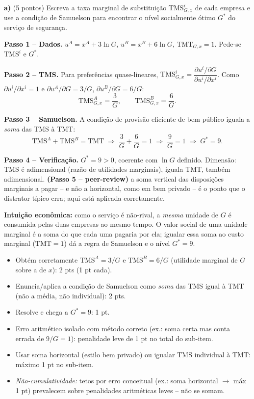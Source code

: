 \textbf{a)} (5 pontos) Escreva a taxa marginal de substitui\c{c}\~ao $\text{TMS}^i_{G,x}$ de cada empresa e use a condi\c{c}\~ao de Samuelson para encontrar o n\'ivel socialmente \'otimo $G^*$ do servi\c{c}o de seguran\c{c}a.
\resolucaobox{7.6cm}
\begin{solucao}
\textbf{Passo 1 -- Dados.} $u^A = x^A + 3\ln G$, $u^B = x^B + 6\ln G$, $\text{TMT}_{G,x}=1$. Pede-se $\text{TMS}^i$ e $G^*$.

\textbf{Passo 2 -- TMS.} Para prefer\^encias quase-lineares, $\text{TMS}^i_{G,x} = \dfrac{\partial u^i/\partial G}{\partial u^i/\partial x^i}$. Como $\partial u^i/\partial x^i = 1$ e $\partial u^A/\partial G = 3/G$, $\partial u^B/\partial G = 6/G$:
\[ \text{TMS}^A_{G,x} = \frac{3}{G}, \qquad \text{TMS}^B_{G,x} = \frac{6}{G}. \]

\textbf{Passo 3 -- Samuelson.} A condi\c{c}\~ao de provis\~ao eficiente de bem p\'ublico iguala a \emph{soma} das TMS \`a TMT:
\[ \text{TMS}^A + \text{TMS}^B = \text{TMT} \;\Longrightarrow\; \frac{3}{G} + \frac{6}{G} = 1 \;\Longrightarrow\; \frac{9}{G} = 1 \;\Longrightarrow\; G^* = 9. \]

\textbf{Passo 4 -- Verifica\c{c}\~ao.} $G^*=9>0$, coerente com $\ln G$ definido. Dimens\~ao: TMS \'e adimensional (raz\~ao de utilidades marginais), iguala TMT, tamb\'em adimensional. \textbf{(Passo 5 -- peer-review)} a soma vertical das disposi\c{c}\~oes marginais a pagar -- e n\~ao a horizontal, como em bem privado -- \'e o ponto que o distrator t\'ipico erra; aqui est\'a aplicada corretamente.

\textbf{Intui\c{c}\~ao econ\^omica:} como o servi\c{c}o \'e n\~ao-rival, a \emph{mesma} unidade de $G$ \'e consumida pelas duas empresas ao mesmo tempo. O valor social de uma unidade marginal \'e a soma do que cada uma pagaria por ela; igualar essa soma ao custo marginal ($\text{TMT}=1$) d\'a a regra de Samuelson e o n\'ivel $G^*=9$.
\rubricalabel
\begin{itemize}\item Obt\'em corretamente $\text{TMS}^A = 3/G$ e $\text{TMS}^B = 6/G$ (utilidade marginal de $G$ sobre a de $x$): 2 pts (1 pt cada).\item Enuncia/aplica a condi\c{c}\~ao de Samuelson como \emph{soma} das TMS igual \`a TMT (n\~ao a m\'edia, n\~ao individual): 2 pts.\item Resolve e chega a $G^*=9$: 1 pt.\item Erro aritm\'etico isolado com m\'etodo correto (ex.: soma certa mas conta errada de $9/G=1$): penalidade leve de 1 pt no total do sub-item.\item Usar soma horizontal (estilo bem privado) ou igualar TMS individual \`a TMT: m\'aximo 1 pt no sub-item.\item \emph{N\~ao-cumulatividade:} tetos por erro conceitual (ex.: soma horizontal $\to$ m\'ax 1 pt) prevalecem sobre penalidades aritm\'eticas leves -- n\~ao se somam.\end{itemize}
\end{solucao}

